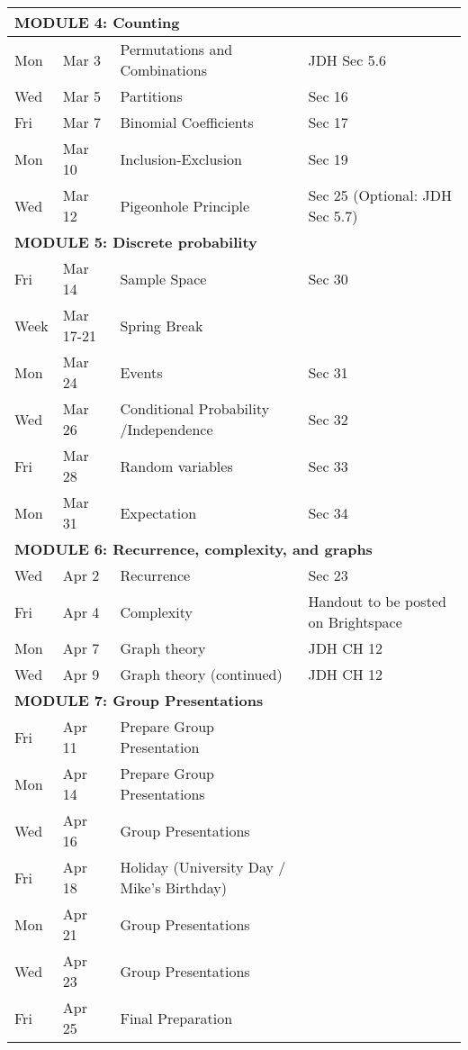 \documentclass[letterpaper]{inzane_syllabus} %
\begin{document}
\begin{center}
\begin{tabularx}{\textwidth}{p{2cm}p{2cm}p{8cm}p{9.5cm}}
\hline
\multicolumn{4}{l}{\textbf{\textcolor{myCOLOR}{\large MODULE 4: Counting}}} \\
\hline
Mon &  Mar 3  & Permutations and Combinations & JDH Sec 5.6\\
Wed &  Mar 5& Partitions & Sec 16 \\
 Fri &  Mar 7  & Binomial Coefficients & Sec 17  \\
 Mon &  Mar 10 & Inclusion-Exclusion & Sec 19 \\
 Wed &  Mar 12  & Pigeonhole Principle & Sec 25 (Optional: JDH Sec 5.7) \\
\hline
\multicolumn{4}{l}{\textbf{\textcolor{myCOLOR}{\large MODULE 5: Discrete probability}}} \\
\hline
Fri &  Mar 14 & Sample Space  & Sec 30 \\
Week &  Mar 17-21 & Spring Break & \\ 
Mon &  Mar 24 & Events & Sec 31 \\
Wed &  Mar 26 &  Conditional Probability /Independence &  Sec 32\\
Fri &  Mar 28 & Random variables & Sec 33 \\
Mon & Mar 31 & Expectation & Sec 34 \\
\hline
\multicolumn{4}{l}{\textbf{\textcolor{myCOLOR}{\large MODULE 6: Recurrence, complexity, and graphs}}} \\
\hline
Wed &  Apr 2 & Recurrence  & Sec 23 \\
Fri &  Apr 4 & Complexity & Handout to be posted on Brightspace \\
Mon &  Apr 7 & Graph theory & JDH CH 12 \\
Wed &  Apr 9 & Graph theory (continued) & JDH CH 12 \\
\hline
\multicolumn{4}{l}{\textbf{\textcolor{myCOLOR}{\large MODULE 7: Group Presentations}}} \\
\hline
Fri &  Apr 11 & Prepare Group Presentation & \\
Mon &  Apr 14 & Prepare Group Presentations & \\
Wed &  Apr 16 & Group Presentations & \\
Fri &  Apr 18 & Holiday (University Day / Mike's Birthday) & \\
Mon &  Apr 21 & Group Presentations  & \\
Wed &  Apr 23 & Group Presentations & \\
Fri &  Apr 25 & Final Preparation &\\

\end{tabularx}
\end{center}
\end{document}
